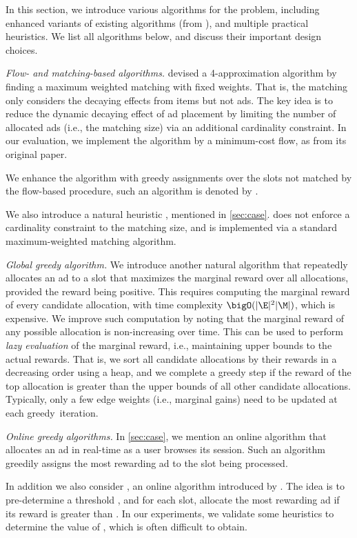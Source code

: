 In this section, we introduce 
various algorithms for the \streamads problem, including 
enhanced variants of existing algorithms (from \citep{ieong2014advertising}), and multiple practical heuristics.
We list all algorithms below, and discuss their important design choices. 

\smallskip
\noindent
\emph{Flow- and matching-based algorithms.}
\citet{ieong2014advertising} devised a 4-approximation algorithm \algflow by finding a maximum weighted matching with fixed weights.
That is, the matching only considers the decaying effects from items but not ads.
The key idea is to reduce the dynamic decaying effect of ad placement %
by limiting the number of allocated ads (i.e., the matching size) via an additional cardinality constraint.
In our evaluation, we implement the \algflow algorithm by a minimum-cost flow, 
as from its original paper.~%
%

We enhance the \algflow algorithm with greedy assignments over the slots not matched by the flow-based procedure,
such an algorithm is denoted by \algflowg.

We also introduce a natural heuristic \algmwm, mentioned in \cref{sec:case}.
\algmwm does not enforce a cardinality constraint to the matching size,
and is
implemented via a standard maximum-weighted matching algorithm.


\smallskip
\noindent
\emph{Global greedy algorithm.}
We introduce another natural algorithm \alggglobal that repeatedly allocates an ad to a slot that maximizes the marginal reward over all allocations, 
provided the reward being positive. %
This requires computing the marginal reward of every candidate allocation, with time complexity $\bigO(|\E|^2 |\M|)$, which is expensive.
We improve such computation by noting 
that the marginal reward of any possible allocation is non-increasing over time.
This 
can be used to perform
\emph{lazy evaluation} of the marginal reward, i.e., maintaining upper bounds to the actual rewards.
That is, we sort all candidate allocations by their rewards in a decreasing order using a heap, and
we complete a greedy step if the reward of the top allocation is greater than the %
upper bounds of all other candidate allocations.
Typically, only a few edge weights (i.e., marginal gains) need to be updated at each  greedy~iteration. %


\smallskip
\noindent
\emph{Online greedy algorithms.}
In \cref{sec:case}, we mention an online algorithm \alggforward that allocates an ad in real-time as a user browses its session.
Such an algorithm greedily assigns the most rewarding ad to the slot being processed.

In addition we also consider \alggonline, an online algorithm introduced by \citet{ieong2014advertising}. %
The idea is to pre-determine a threshold \Cthr, and 
for each slot, allocate the most rewarding ad if its reward is greater than \Cthr.
In our experiments, we validate some heuristics to determine the value of \Cthr, which is often difficult to obtain.
